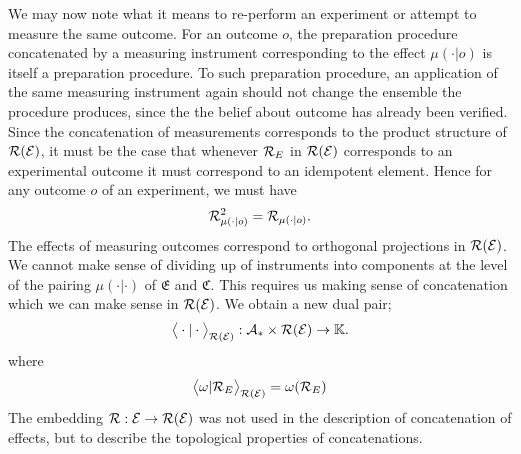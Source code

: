 \documentclass[11pt]{article}
\begin{document}
We may now note what it means to re-perform an experiment or attempt to measure the same outcome. For an outcome $o$, the preparation procedure concatenated by a measuring instrument corresponding to the effect $\mu(\cdot|o)$ is itself a preparation procedure. To such preparation procedure, an application of the same measuring instrument again should not change the ensemble the procedure produces, since the the belief about outcome has already been verified. Since the concatenation of measurements corresponds to the product structure of $\mathcal{R}(\mathcal{E})$, it must be the case that whenever $\mathcal{R}_{E}$ in $\mathcal{R}(\mathcal{E})$ corresponds to an experimental outcome it must correspond to an idempotent element. Hence for any outcome $o$ of an experiment, we must have
$$\mathcal{R}_{\mu(\cdot|o)}^2=\mathcal{R}_{\mu(\cdot|o)}.$$
The effects of measuring outcomes correspond to orthogonal projections in $\mathcal{R}(\mathcal{E})$. We cannot make sense of dividing up of instruments into components at the level of the pairing $\mu(\cdot|\cdot)$ of $\mathfrak{E}$ and $\mathfrak{C}$. This requires us making sense of concatenation which we can make sense 
in $\mathcal{R}(\mathcal{E})$. We obtain a new dual pair;
\begin{align*}
	\big\langle \cdot|\cdot\big\rangle_{\mathcal{R}(\mathcal{E})} :\mathcal{A}_* \times \mathcal{R}(\mathcal{E})\to \mathbb{K}.
\end{align*}
where $$\big\langle \omega|\mathcal{R}_E\big\rangle_{\mathcal{R}(\mathcal{E})}=\omega(\mathcal{R}_E)$$
The embedding $\mathcal{R}:\mathcal{E}\to \mathcal{R}(\mathcal{E})$ was not used in the description of concatenation of effects, but to describe the topological properties of concatenations.
\end{document}
